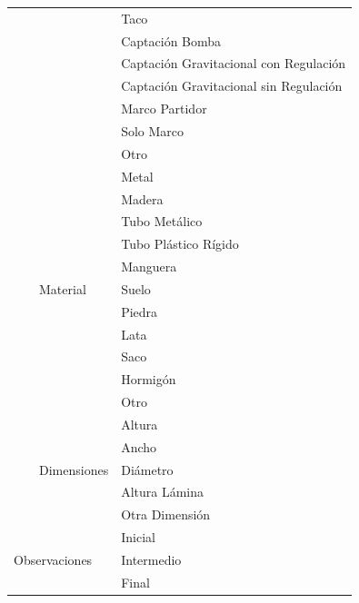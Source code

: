 \documentclass[]{article}
\begin{document}
\begin{longtable}{|p{3cm}|p{3.5cm}|p{3.5cm}|p{3.5cm}|}
    \cline{4-4}
    & & & Taco\\
    \cline{4-4}
    & & & Captación Bomba\\
    \cline{4-4}
    & & & Captación Gravitacional con Regulación\\
    \cline{4-4}
    & & & Captación Gravitacional sin Regulación\\
    \cline{4-4}
    & & & Marco Partidor\\
    \cline{4-4}
    & & & Solo Marco\\
    \cline{4-4}
    & & & Otro\\
    \cline{3-4}
    & & \multirow {11}{3.5cm}{Material} & Metal\\
    \cline{4-4}
    & & & Madera\\
    \cline{4-4}
    & & & Tubo Metálico\\
    \cline{4-4}
    & & & Tubo Plástico Rígido\\
    \cline{4-4}
    & & & Manguera\\
    \cline{4-4}
    & & & Suelo\\
    \cline{4-4}
    & & & Piedra\\
    \cline{4-4}
    & & & Lata\\
    \cline{4-4}
    & & & Saco\\
    \cline{4-4}
    & & & Hormigón\\
    \cline{4-4}
    & & & Otro\\
    \cline{3-4}
    & & \multirow {5}{3.5cm}{Dimensiones} & Altura\\
    \cline{4-4}
    & & & Ancho\\
    \cline{4-4}
    & & & Diámetro\\
    \cline{4-4}
    & & & Altura Lámina\\
    \cline{4-4}
    & & & Otra Dimensión\\
    \cline{3-4}
    \multicolumn{3}{|l|}{\multirow{3}{*}{Observaciones}} &  Inicial\\
	\cline{4-4}
	& & & Intermedio\\
	\cline{4-4}
	& & & Final\\
    \cline{3-4}
 
    
    
    \hline
\end{longtable}
\end{document}
